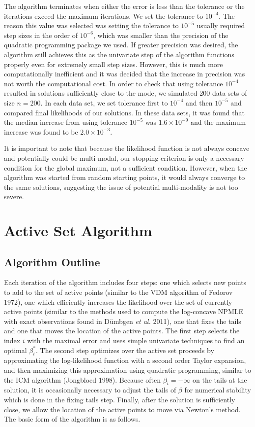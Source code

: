 \documentclass[10pt]{article}
\begin{document}
	The algorithm terminates when either the error is less than the tolerance or the iterations exceed the maximum iterations. We set the tolerance to $10^{-4}$. The reason this value was selected was setting the tolerance to $10^{-5}$ usually required step sizes in the order of $10^{-6}$, which was smaller than the precision of the quadratic programming package we used. If greater precision was desired, the algorithm still achieves this as the univariate step of the algorithm functions properly even for extremely small step sizes. However, this is much more computationally inefficient and it was decided that the increase in precision was not worth the computational cost. In order to check that using tolerance $10^{-4}$ resulted in solutions sufficiently close to the mode, we simulated 200 data sets of size $n = 200$. In each data set, we set tolerance first to $10^{-4}$ and then $10^{-5}$ and compared final likelihoods of our solutions. In these data sets, it was found that the median increase from using tolerance $10^{-5}$ was $1.6 \times 10^{-9}$ and the maximum increase was found to be $2.0 \times 10^{-3}$. 
	
	It is important to note that because the likelihood function is not always concave and potentially could be multi-modal, our stopping criterion is only a necessary condition for the global maximum, not a sufficient condition. However, when the algorithm was started from random starting points, it would always converge to the same solutions, suggesting the issue of potential multi-modality is not too severe.   
	
{\section{Active Set Algorithm} }
	
	{\subsection{Algorithm Outline} } 
	
	
	Each iteration of the algorithm includes four steps: one which selects new points to add to the set of active points (similar to the VDM algorithm of Fedorov 1972), one which efficiently increases the likelihood over the set of currently active points (similar to the methods used to compute the log-concave NPMLE with exact observations found in D\"umbgen \emph{et al.} 2011), one that fixes the tails and one that moves the location of the active points. The first step selects the index $i$ with the maximal error and uses simple univariate techniques to find an optimal $\beta_i^*$. The second step optimizes over the active set proceeds by approximating the log-likelihood function with a second order Taylor expansion, and then maximizing this approximation using quadratic programming, similar to the ICM algorithm (Jongbloed 1998).  Because often $\beta_i = -\infty$ on the tails at the solution, it is occasionally necessary to adjust the tails of $\beta$ for numerical stability which is done in the fixing tails step. Finally, after the solution is sufficiently close, we allow the location of the active points to move via Newton's method. The basic form of the algorithm is as follows.
	
\end{document}
